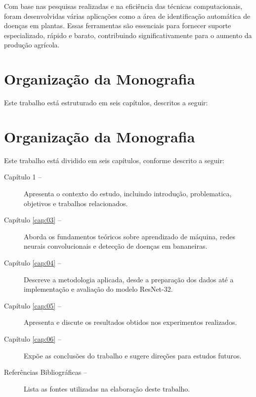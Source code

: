 Com base nas pesquisas realizadas e na eficiência das técnicas computacionais, foram desenvolvidas várias aplicações como a área de identificação automática de doenças em plantas. Essas ferramentas são essenciais para fornecer suporte especializado, rápido e barato, contribuindo significativamente para o aumento da produção agrícola.



\section{Organização da Monografia}

Este trabalho está estruturado em seis capítulos, descritos a seguir:

\section{Organização da Monografia}

Este trabalho está dividido em seis capítulos, conforme descrito a seguir:

\begin{description}
    \item[Capítulo 1 --] Apresenta o contexto do estudo, incluindo introdução, problematica, objetivos  e trabalhos relacionados.

    \item[Capítulo \ref{cap:03} --] Aborda os fundamentos teóricos sobre aprendizado de máquina, redes neurais convolucionais e detecção de doenças em bananeiras.

    \item[Capítulo \ref{cap:04} --] Descreve a metodologia aplicada, desde a preparação dos dados até a implementação e avaliação do modelo ResNet-32.

    \item[Capítulo \ref{cap:05} --] Apresenta e discute os resultados obtidos nos experimentos realizados.

    \item[Capítulo \ref{cap:06} --] Expõe as conclusões do trabalho e sugere direções para estudos futuros.

    \item[Referências Bibliográficas --] Lista as fontes utilizadas na elaboração deste trabalho.
\end{description}


